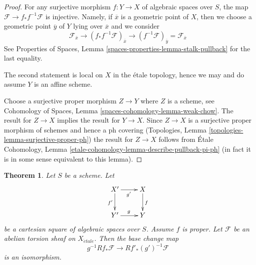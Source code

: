\documentclass{stacks-project}
\theoremstyle{plain}
\newtheorem{theorem}[subsection]{Theorem}
\theoremstyle{definition}
\theoremstyle{remark}
\numberwithin{equation}{subsection}
\def\etale{{\acute{e}tale}}
\begin{document}
\begin{proof}
For any surjective morphism $f : Y \to X$ of algebraic spaces over $S$,
the map $\mathcal{F} \to f_*f^{-1}\mathcal{F}$ is injective.
Namely, if $\overline{x}$ is a geometric point of $X$, then we
choose a geometric point $\overline{y}$ of $Y$ lying over $\overline{x}$
and we consider
$$
\mathcal{F}_{\overline{x}} \to
(f_*f^{-1}\mathcal{F})_{\overline{x}} \to
(f^{-1}\mathcal{F})_{\overline{y}} = \mathcal{F}_{\overline{x}}
$$
See Properties of Spaces, Lemma \ref{spaces-properties-lemma-stalk-pullback}
for the last equality.

\medskip\noindent
The second statement is local on $X$ in the \'etale topology, hence we may
and do assume $Y$ is an affine scheme.

\medskip\noindent
Choose a surjective proper morphism $Z \to Y$ where $Z$ is a scheme, see
Cohomology of Spaces, Lemma \ref{spaces-cohomology-lemma-weak-chow}.
The result for $Z \to X$ implies the result for $Y \to X$.
Since $Z \to X$ is a surjective proper morphism of schemes
and hence a ph covering
(Topologies, Lemma \ref{topologies-lemma-surjective-proper-ph})
the result for $Z \to X$ follows from
\'Etale Cohomology, Lemma \ref{etale-cohomology-lemma-describe-pullback-pi-ph}
(in fact it is in some sense equivalent to this lemma).
\end{proof}

\begin{theorem}
\label{theorem-proper-base-change}
Let $S$ be a scheme. Let
$$
\xymatrix{
X' \ar[r]_{g'} \ar[d]_{f'} & X \ar[d]^f \\
Y' \ar[r]^g & Y
}
$$
be a cartesian square of algebraic spaces over $S$.
Assume $f$ is proper.
Let $\mathcal{F}$ be an abelian torsion sheaf on $X_\etale$.
Then the base change map
$$
g^{-1}Rf_*\mathcal{F} \longrightarrow Rf'_*(g')^{-1}\mathcal{F}
$$
is an isomorphism.
\end{theorem}
\end{document}
